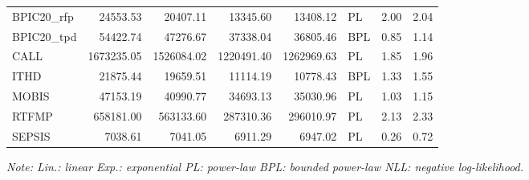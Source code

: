 \begin{tabular}{lrrrrlrr}
BPIC20_rfp &   24553.53 &   20407.11 &   13345.60 &   13408.12 &       PL &       2.00 &        2.04 \\
BPIC20_tpd &   54422.74 &   47276.67 &   37338.04 &   36805.46 &      BPL &       0.85 &        1.14 \\
      CALL & 1673235.05 & 1526084.02 & 1220491.40 & 1262969.63 &       PL &       1.85 &        1.96 \\
      ITHD &   21875.44 &   19659.51 &   11114.19 &   10778.43 &      BPL &       1.33 &        1.55 \\
     MOBIS &   47153.19 &   40990.77 &   34693.13 &   35030.96 &       PL &       1.03 &        1.15 \\
     RTFMP &  658181.00 &  563133.60 &  287310.36 &  296010.97 &       PL &       2.13 &        2.33 \\
    SEPSIS &    7038.61 &    7041.05 &    6911.29 &    6947.02 &       PL &       0.26 &        0.72 \\
\bottomrule
\end{tabular}

\noindent\textit{Note: Lin.: linear \quad Exp.: exponential \quad PL: power-law \quad BPL: bounded power-law \quad NLL: negative log-likelihood.}
